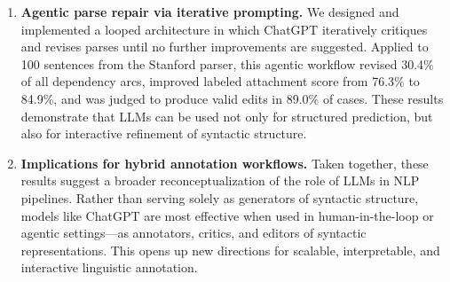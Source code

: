 \begin{enumerate}
    \item \textbf{Agentic parse repair via iterative prompting.} We designed and implemented a looped architecture in which ChatGPT iteratively critiques and revises parses until no further improvements are suggested. Applied to 100 sentences from the Stanford parser, this agentic workflow revised 30.4\% of all dependency arcs, improved labeled attachment score from 76.3\% to 84.9\%, and was judged to produce valid edits in 89.0\% of cases. These results demonstrate that LLMs can be used not only for structured prediction, but also for interactive refinement of syntactic structure.

    \item \textbf{Implications for hybrid annotation workflows.} Taken together, these results suggest a broader reconceptualization of the role of LLMs in NLP pipelines. Rather than serving solely as generators of syntactic structure, models like ChatGPT are most effective when used in human-in-the-loop or agentic settings—as annotators, critics, and editors of syntactic representations. This opens up new directions for scalable, interpretable, and interactive linguistic annotation.
\end{enumerate}